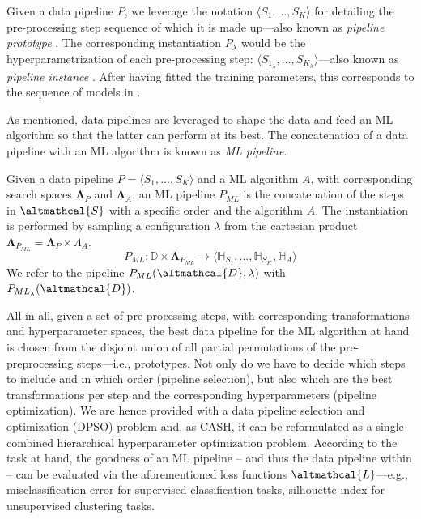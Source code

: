 Given a data pipeline $P$, we leverage the notation $\langle S_1, \dots, S_K \rangle$ for detailing the pre-processing step sequence of which it is made up---also known as \textit{pipeline prototype} \cite{quemy2019data}.
The corresponding instantiation $P_{\lambda}$ would be the hyperparametrization of each pre-processing step: $\langle S_{1_{\lambda}}, \dots, S_{K_{\lambda}} \rangle$---also known as \textit{pipeline instance} \cite{quemy2019data}.
After having fitted the training parameters, this corresponds to the sequence of models in .

As mentioned, data pipelines are leveraged to shape the data and feed an ML algorithm so that the latter can perform at its best.
The concatenation of a data pipeline with an ML algorithm is known as \textit{ML pipeline}.

\begin{definition}
    Given a data pipeline $P = \langle S_1,\dots, S_{K} \rangle$ and a ML algorithm $A$, with corresponding search spaces $\pmb{\Lambda}_{P}$ and $\pmb{\Lambda}_{A}$, an ML pipeline $P_{ML}$ is the concatenation of the steps in $\altmathcal{S}$ with a specific order and the algorithm $A$.
    The instantiation is performed by sampling a configuration $\lambda$ from the cartesian product  $\pmb{\Lambda}_{P_{ML}}  = \pmb{\Lambda}_{P} \times {\Lambda}_{A}$.
    \begin{equation*}
        P_{ML}: \mathbb{D} \times \pmb{\Lambda}_{P_{ML}} \rightarrow \langle \mathbb{H}_{S_1}, \dots,  \mathbb{H}_{S_K}, \mathbb{H}_{A} \rangle
    \end{equation*}
   We refer to the pipeline $P_{ML}(\altmathcal{D}, \lambda)$ with $P_{ML_{\lambda}}(\altmathcal{D})$.
\end{definition}

All in all, given a set of pre-processing steps, with corresponding transformations and hyperparameter spaces, the best data pipeline for the ML algorithm at hand is chosen from the disjoint union of all partial permutations of the pre-preprocessing steps---i.e., prototypes.
Not only do we have to decide which steps to include and in which order (pipeline selection), but also which are the best transformations per step and the corresponding hyperparameters (pipeline optimization).
We are hence provided with a data pipeline selection and optimization (DPSO) problem \cite{quemy2019data} and, as CASH, it can be reformulated as a single combined hierarchical hyperparameter optimization problem.
According to the task at hand, the goodness of an ML pipeline -- and thus the data pipeline within -- can be evaluated via the aforementioned loss functions $\altmathcal{L}$---e.g., misclassification error for supervised classification tasks, silhouette index for unsupervised clustering tasks.


